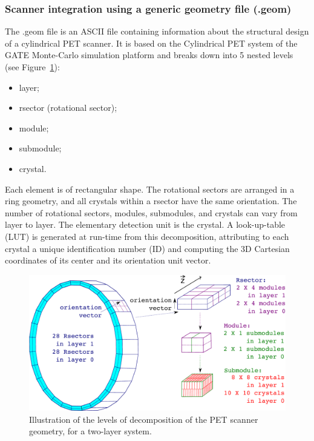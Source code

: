 \documentclass[a4paper, 11pt]{article}
\begin{document}
\subsubsection{Scanner integration using a generic geometry file (.geom)}
\label{sss_scanner_integration_PET_geom}

The .geom file is an ASCII file containing information about the structural design of a cylindrical PET scanner. 
It is based on the Cylindrical PET system of the GATE Monte-Carlo simulation platform\cite{GATE} 
and breaks down into 5 nested levels (see Figure~\ref{fig_scanner_decomposition}): 
\begin{itemize}
  \item layer;
  \item rsector (rotational sector); 
  \item module;
  \item submodule;
  \item crystal.
\end{itemize}
Each element is of rectangular shape. The rotational sectors are arranged in a ring geometry, and all crystals within a rsector have the same orientation. 
The number of rotational sectors, modules, submodules, and crystals can vary from layer to layer. 
The elementary detection unit is the crystal.
A look-up-table (LUT) is generated at run-time from this decomposition, attributing to each crystal a unique identification number (ID) and
computing the 3D Cartesian coordinates of its center and its orientation unit vector.

\begin{figure} [h!]
  \centering
  \includegraphics[width=0.8\columnwidth]{./figures/geo_decomposition.pdf}
  \caption{Illustration of the levels of decomposition of the PET scanner geometry, for a two-layer system.}
  \label{fig_scanner_decomposition}
\end{figure}
\end{document}
